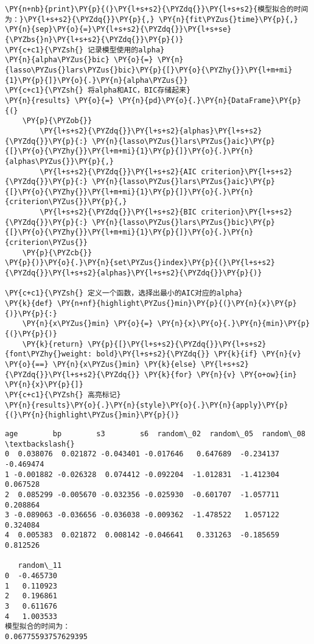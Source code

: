 \begin{Verbatim}[commandchars=\\\{\}]
\PY{n+nb}{print}\PY{p}{(}\PY{l+s+s2}{\PYZdq{}}\PY{l+s+s2}{模型拟合的时间为：}\PY{l+s+s2}{\PYZdq{}}\PY{p}{,} \PY{n}{fit\PYZus{}time}\PY{p}{,} \PY{n}{sep}\PY{o}{=}\PY{l+s+s2}{\PYZdq{}}\PY{l+s+se}{\PYZbs{}n}\PY{l+s+s2}{\PYZdq{}}\PY{p}{)}
\PY{c+c1}{\PYZsh{} 记录模型使用的alpha}
\PY{n}{alpha\PYZus{}bic} \PY{o}{=} \PY{n}{lasso\PYZus{}lars\PYZus{}bic}\PY{p}{[}\PY{o}{\PYZhy{}}\PY{l+m+mi}{1}\PY{p}{]}\PY{o}{.}\PY{n}{alpha\PYZus{}}
\PY{c+c1}{\PYZsh{} 将alpha和AIC，BIC存储起来}
\PY{n}{results} \PY{o}{=} \PY{n}{pd}\PY{o}{.}\PY{n}{DataFrame}\PY{p}{(}
    \PY{p}{\PYZob{}}
        \PY{l+s+s2}{\PYZdq{}}\PY{l+s+s2}{alphas}\PY{l+s+s2}{\PYZdq{}}\PY{p}{:} \PY{n}{lasso\PYZus{}lars\PYZus{}aic}\PY{p}{[}\PY{o}{\PYZhy{}}\PY{l+m+mi}{1}\PY{p}{]}\PY{o}{.}\PY{n}{alphas\PYZus{}}\PY{p}{,}
        \PY{l+s+s2}{\PYZdq{}}\PY{l+s+s2}{AIC criterion}\PY{l+s+s2}{\PYZdq{}}\PY{p}{:} \PY{n}{lasso\PYZus{}lars\PYZus{}aic}\PY{p}{[}\PY{o}{\PYZhy{}}\PY{l+m+mi}{1}\PY{p}{]}\PY{o}{.}\PY{n}{criterion\PYZus{}}\PY{p}{,}
        \PY{l+s+s2}{\PYZdq{}}\PY{l+s+s2}{BIC criterion}\PY{l+s+s2}{\PYZdq{}}\PY{p}{:} \PY{n}{lasso\PYZus{}lars\PYZus{}bic}\PY{p}{[}\PY{o}{\PYZhy{}}\PY{l+m+mi}{1}\PY{p}{]}\PY{o}{.}\PY{n}{criterion\PYZus{}}
    \PY{p}{\PYZcb{}}
\PY{p}{)}\PY{o}{.}\PY{n}{set\PYZus{}index}\PY{p}{(}\PY{l+s+s2}{\PYZdq{}}\PY{l+s+s2}{alphas}\PY{l+s+s2}{\PYZdq{}}\PY{p}{)}

\PY{c+c1}{\PYZsh{} 定义一个函数，选择出最小的AIC对应的alpha}
\PY{k}{def} \PY{n+nf}{highlight\PYZus{}min}\PY{p}{(}\PY{n}{x}\PY{p}{)}\PY{p}{:}
    \PY{n}{x\PYZus{}min} \PY{o}{=} \PY{n}{x}\PY{o}{.}\PY{n}{min}\PY{p}{(}\PY{p}{)}
    \PY{k}{return} \PY{p}{[}\PY{l+s+s2}{\PYZdq{}}\PY{l+s+s2}{font\PYZhy{}weight: bold}\PY{l+s+s2}{\PYZdq{}} \PY{k}{if} \PY{n}{v} \PY{o}{==} \PY{n}{x\PYZus{}min} \PY{k}{else} \PY{l+s+s2}{\PYZdq{}}\PY{l+s+s2}{\PYZdq{}} \PY{k}{for} \PY{n}{v} \PY{o+ow}{in} \PY{n}{x}\PY{p}{]}
\PY{c+c1}{\PYZsh{} 高亮标记}
\PY{n}{results}\PY{o}{.}\PY{n}{style}\PY{o}{.}\PY{n}{apply}\PY{p}{(}\PY{n}{highlight\PYZus{}min}\PY{p}{)}
\end{Verbatim}

\begin{Verbatim}[commandchars=\\\{\}]
        age        bp        s3        s6  random\_02  random\_05  random\_08  \textbackslash{}
0  0.038076  0.021872 -0.043401 -0.017646   0.647689  -0.234137  -0.469474
1 -0.001882 -0.026328  0.074412 -0.092204  -1.012831  -1.412304   0.067528
2  0.085299 -0.005670 -0.032356 -0.025930  -0.601707  -1.057711   0.208864
3 -0.089063 -0.036656 -0.036038 -0.009362  -1.478522   1.057122   0.324084
4  0.005383  0.021872  0.008142 -0.046641   0.331263  -0.185659   0.812526

   random\_11
0  -0.465730
1   0.110923
2   0.196861
3   0.611676
4   1.003533
模型拟合的时间为：
0.06775593757629395
\end{Verbatim}

